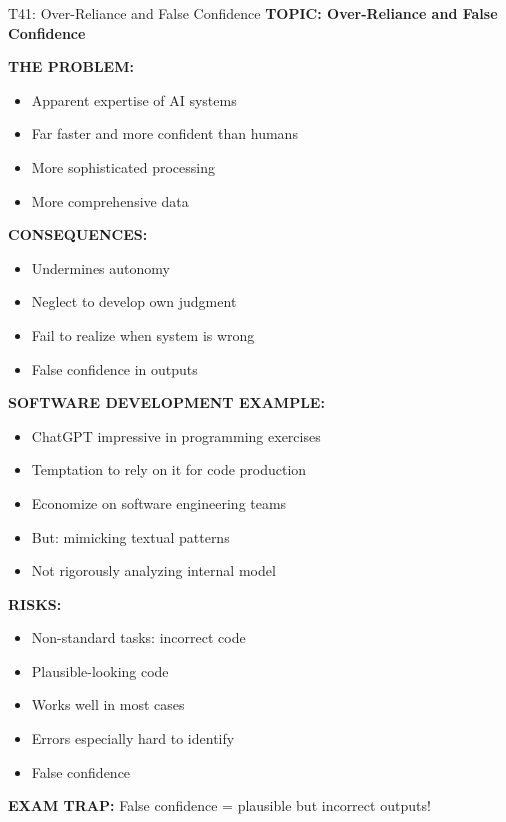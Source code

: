 \documentclass[8pt]{beamer}
\begin{document}
	\begin{frame}{T41: Over-Reliance and False Confidence}
		\fontsize{6.5}{7.5}\selectfont
		\textbf{TOPIC: Over-Reliance and False Confidence}
		
		\vspace{0.1cm}
		\textbf{THE PROBLEM:}
		\begin{itemize}
			\item Apparent expertise of AI systems
			\item Far faster and more confident than humans
			\item More sophisticated processing
			\item More comprehensive data
		\end{itemize}
		
		\vspace{0.1cm}
		\textbf{CONSEQUENCES:}
		\begin{itemize}
			\item Undermines autonomy
			\item Neglect to develop own judgment
			\item Fail to realize when system is wrong
			\item False confidence in outputs
		\end{itemize}
		
		\vspace{0.1cm}
		\textbf{SOFTWARE DEVELOPMENT EXAMPLE:}
		\begin{itemize}
			\item ChatGPT impressive in programming exercises
			\item Temptation to rely on it for code production
			\item Economize on software engineering teams
			\item But: mimicking textual patterns
			\item Not rigorously analyzing internal model
		\end{itemize}
		
		\vspace{0.1cm}
		\textbf{RISKS:}
		\begin{itemize}
			\item Non-standard tasks: incorrect code
			\item Plausible-looking code
			\item Works well in most cases
			\item Errors especially hard to identify
			\item False confidence
		\end{itemize}
		
		\textcolor{myred}{\textbf{EXAM TRAP:}} False confidence = \textcolor{myblue}{plausible but incorrect outputs}!
	\end{frame}
	
\end{document}

